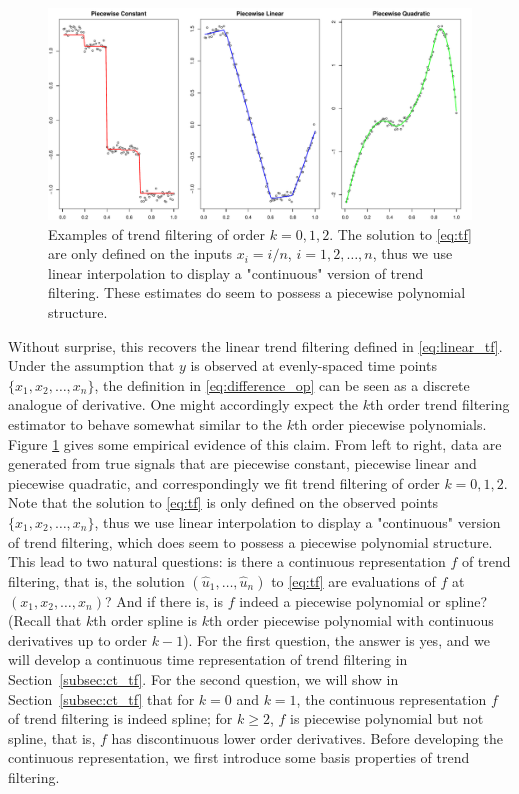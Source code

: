 \documentclass[a4paper]{article}
\begin{document}
\begin{figure}[t!]
\centering
\includegraphics[width = 1\textwidth]{Figures/Figure1.pdf}
\caption{Examples of trend filtering of order $k =0, 1, 2$. The solution to \eqref{eq:tf} are only defined on the inputs $x_i = i/n$, $i=1,2,\ldots, n$, thus we use linear interpolation to display a "continuous" version of trend filtering. These estimates do seem to possess a piecewise polynomial structure.}
\label{fig:Figure1_examples}
\end{figure}

Without surprise, this recovers the linear trend filtering defined in \eqref{eq:linear_tf}. Under the assumption that $y$ is observed at evenly-spaced time points $\{x_1,x_2,\ldots, x_n\}$, the definition in \eqref{eq:difference_op} can be seen as a discrete analogue of derivative. One might accordingly expect the $k$th order trend filtering estimator to behave somewhat similar to the $k$th order piecewise polynomials. Figure \ref{fig:Figure1_examples} gives some empirical evidence of this claim. From left to right, data are generated from true signals that are piecewise constant, piecewise linear and piecewise quadratic, and correspondingly we fit trend filtering of order $k = 0,1,2$. Note that the solution to \eqref{eq:tf} is only defined on the observed points $\{x_1,x_2, \ldots, x_n\}$, thus we use linear interpolation to display a "continuous" version of trend filtering, which does seem to possess a piecewise polynomial structure. This lead to two natural questions: is there a continuous representation $f$ of trend filtering, that is, the solution $(\hat{u}_1,\ldots, \hat{u}_n)$ to \eqref{eq:tf} are evaluations of $f$ at $(x_1, x_2,\ldots, x_n)$? And if there is, is $f$ indeed a piecewise polynomial or spline? (Recall that $k$th order spline is $k$th order piecewise polynomial with continuous derivatives up to order $k-1$). For the first question, the answer is yes, and we will develop a continuous time representation of trend filtering in Section~\ref{subsec:ct_tf}. For the second question, we will show in Section~\ref{subsec:ct_tf} that for $k=0$ and $k=1$, the continuous representation $f$ of trend filtering is indeed spline; for $k\geq 2$, $f$ is piecewise polynomial but not spline, that is, $f$ has discontinuous lower order derivatives. Before developing the continuous representation, we first introduce some basis properties of trend filtering.
\end{document}
